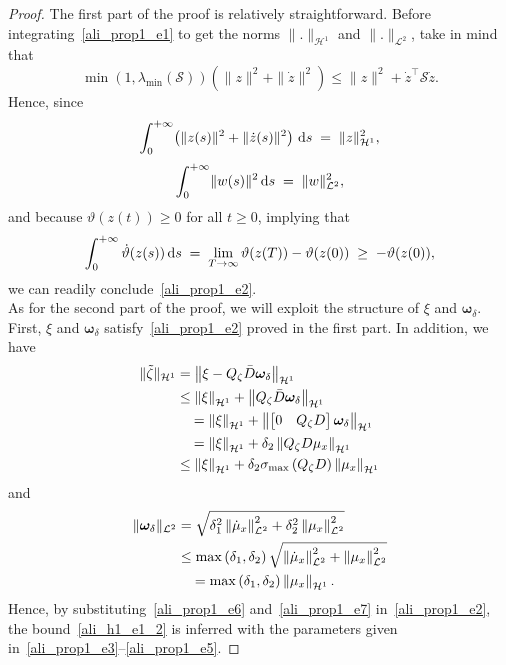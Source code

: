\begin{proof}
The first part of the proof is relatively straightforward. Before integrating~\eqref{ali_prop1_e1} to get the norms $\| . \|_{\mathcal{H}^{1}}$ and $\| . \|_{\mathcal{L}^{2}}$, take in mind that
$$
\min\left(1,\lambda_{\min}(\mathcal{S})\right) \left(  \| z \|^{2} +  \| \dot{z} \|^{2}  \right) \leq \| z \|^{2} + \dot{z}^{\top} \mathcal{S} \dot{z}.
$$
%
Hence, since 
$$
\int_{0}^{+\infty} \!\left( \| z(s) \|^{2} + \| \dot{z}(s) \|^{2} \right) \, {\rm d}s \;=\; \| z \|^{2}_{\mathcal{H}^{1}},
$$
$$
\int_{0}^{+\infty} \! \| w(s) \|^{2} \, {\rm d}s \;=\; \| w \|^{2}_{\mathcal{L}^{2}},
$$
and because $\vartheta(z(t)) \geq 0$ for all $t \geq 0$, implying that 
$$
\int_{0}^{+\infty} \dot{\vartheta}(z(s)) \, {\rm d}s \;=\; \lim_{T\to\infty} \vartheta(z(T)) - \vartheta(z(0)) \;\geq\; - \vartheta(z(0)),
$$
we can readily conclude~\eqref{ali_prop1_e2}.\\
As for the second part of the proof, we will exploit the structure of $\xi$ and $\bm{\omega}_{\delta}$. First, $\xi$ and $\bm{\omega}_{\delta}$ satisfy~\eqref{ali_prop1_e2} proved in the first part. In addition, we have
%
\begin{align}\label{ali_prop1_e6}
\| \tilde{\zeta} \|_{\mathcal{H}^{1}} &= \left\| \xi - Q_{\zeta} \bar{D} \bm{\omega}_{\delta} \right\|_{\mathcal{H}^{1}} \notag \\
&\leq \left\| \xi \right\|_{\mathcal{H}^{1}} + \left\| Q_{\zeta} \bar{D} \bm{\omega}_{\delta} \right\|_{\mathcal{H}^{1}} \notag \\
&\quad= \left\| \xi \right\|_{\mathcal{H}^{1}} + \left\| \begin{bmatrix}0 & Q_{\zeta} D \end{bmatrix} \bm{\omega}_{\delta} \right\|_{\mathcal{H}^{1}} \notag \\
&\quad= \left\| \xi \right\|_{\mathcal{H}^{1}} + \delta_{2} \left\| Q_{\zeta} D \mu_{x} \right\|_{\mathcal{H}^{1}} \notag \\
&\leq \left\| \xi \right\|_{\mathcal{H}^{1}} + \delta_{2} \sigma_{\max}\left(Q_{\zeta}D\right) \left\| \mu_{x} \right\|_{\mathcal{H}^{1}}
\end{align}
and
%
\begin{align}\label{ali_prop1_e7}
\| \bm{\omega}_{\delta} \|_{\mathcal{L}^{2}} &= \sqrt{ \delta^{2}_{1}  \left\| \dot{\mu}_{x} \right\|^{2}_{\mathcal{L}^{2}} + \delta^{2}_{2}  \left\| \mu_{x} \right\|^{2}_{\mathcal{L}^{2}} } \notag \\
&\leq \max\left(\delta_{1}, \delta_{2} \right)  \sqrt{ \left\| \dot{\mu}_{x} \right\|^{2}_{\mathcal{L}^{2}} + \left\| \mu_{x} \right\|^{2}_{\mathcal{L}^{2}} } \notag \\
&\quad= \max\left(\delta_{1}, \delta_{2} \right) \left\| \mu_{x} \right\|_{\mathcal{H}^{1}}.
\end{align}
Hence, by substituting~\eqref{ali_prop1_e6} and~\eqref{ali_prop1_e7} in~\eqref{ali_prop1_e2}, the bound~\eqref{ali_h1_e1_2} is inferred with the parameters given in~\eqref{ali_prop1_e3}--\eqref{ali_prop1_e5}.
%
\end{proof}
